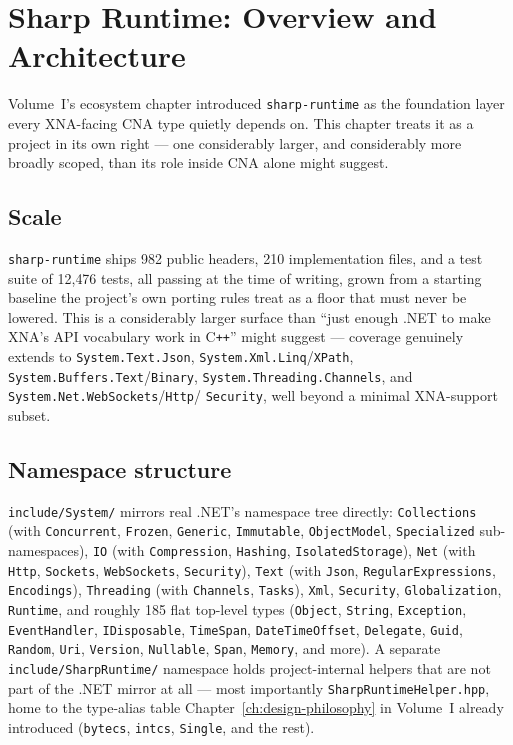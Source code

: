 \chapter{Sharp Runtime: Overview and Architecture}
\label{ch:sharp-runtime-overview}

Volume~I's ecosystem chapter introduced \texttt{sharp-runtime} as the foundation layer every
XNA-facing CNA type quietly depends on. This chapter treats it as a project in its own right
--- one considerably larger, and considerably more broadly scoped, than its role inside CNA
alone might suggest.

\section{Scale}

\texttt{sharp-runtime} ships 982 public headers, 210 implementation files, and a test suite
of 12{,}476 tests, all passing at the time of writing, grown from a starting baseline the
project's own porting rules treat as a floor that must never be lowered. This is a
considerably larger surface than ``just enough .NET to make XNA's API vocabulary work in
C\texttt{++}'' might suggest --- coverage genuinely extends to \texttt{System.Text.Json},
\texttt{System.Xml.Linq}/\texttt{XPath}, \texttt{System.Buffers.Text}/\texttt{Binary},
\texttt{System.Threading.Channels}, and \texttt{System.Net.WebSockets}/\texttt{Http}/%
\texttt{Security}, well beyond a minimal XNA-support subset.

\section{Namespace structure}

\texttt{include/System/} mirrors real .NET's namespace tree directly:
\texttt{Collections} (with \texttt{Concurrent}, \texttt{Frozen}, \texttt{Generic},
\texttt{Immutable}, \texttt{ObjectModel}, \texttt{Specialized} sub-namespaces),
\texttt{IO} (with \texttt{Compression}, \texttt{Hashing}, \texttt{IsolatedStorage}),
\texttt{Net} (with \texttt{Http}, \texttt{Sockets}, \texttt{WebSockets}, \texttt{Security}),
\texttt{Text} (with \texttt{Json}, \texttt{RegularExpressions}, \texttt{Encodings}),
\texttt{Threading} (with \texttt{Channels}, \texttt{Tasks}), \texttt{Xml}, \texttt{Security},
\texttt{Globalization}, \texttt{Runtime}, and roughly 185 flat top-level types
(\texttt{Object}, \texttt{String}, \texttt{Exception}, \texttt{EventHandler},
\texttt{IDisposable}, \texttt{TimeSpan}, \texttt{DateTimeOffset}, \texttt{Delegate},
\texttt{Guid}, \texttt{Random}, \texttt{Uri}, \texttt{Version}, \texttt{Nullable},
\texttt{Span}, \texttt{Memory}, and more). A separate \texttt{include/SharpRuntime/}
namespace holds project-internal helpers that are not part of the .NET mirror at all ---
most importantly \texttt{SharpRuntimeHelper.hpp}, home to the type-alias table
Chapter~\ref{ch:design-philosophy} in Volume~I already introduced (\texttt{bytecs},
\texttt{intcs}, \texttt{Single}, and the rest).

